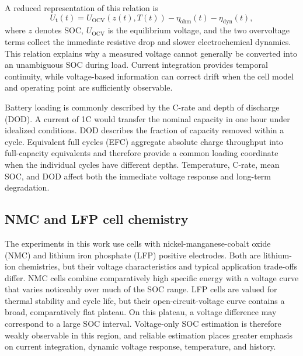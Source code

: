 \documentclass[
    a4paper,
    12pt,
    titlepage,
    bibliography=totoc,
    twoside=on,
    parskip=false,
    numbers=noenddot,
    cleardoublepage=empty,
    DIV=12,
    BCOR=12.0mm,
    headheight=36pt,
    headings=openright
]{scrreprt}
\begin{document}
A reduced representation of this relation is
\begin{equation}
    U_{\mathrm{t}}(t)
    =
    U_{\mathrm{OCV}}\!\left(z(t),T(t)\right)
    -
    \eta_{\mathrm{ohm}}(t)
    -
    \eta_{\mathrm{dyn}}(t),
    \label{eq:fundamental_terminal_voltage}
\end{equation}
where $z$ denotes SOC, $U_{\mathrm{OCV}}$ is the equilibrium voltage, and the two overvoltage terms collect the immediate resistive drop and slower electrochemical dynamics. This relation explains why a measured voltage cannot generally be converted into an unambiguous SOC during load. Current integration provides temporal continuity, while voltage-based information can correct drift when the cell model and operating point are sufficiently observable.

Battery loading is commonly described by the C-rate and depth of discharge (DOD). A current of 1C would transfer the nominal capacity in one hour under idealized conditions. DOD describes the fraction of capacity removed within a cycle. Equivalent full cycles (EFC) aggregate absolute charge throughput into full-capacity equivalents and therefore provide a common loading coordinate when the individual cycles have different depths. Temperature, C-rate, mean SOC, and DOD affect both the immediate voltage response and long-term degradation.

\subsection{NMC and LFP cell chemistry}
The experiments in this work use cells with nickel-manganese-cobalt oxide (NMC) and lithium iron phosphate (LFP) positive electrodes. Both are lithium-ion chemistries, but their voltage characteristics and typical application trade-offs differ. NMC cells combine comparatively high specific energy with a voltage curve that varies noticeably over much of the SOC range. LFP cells are valued for thermal stability and cycle life, but their open-circuit-voltage curve contains a broad, comparatively flat plateau. On this plateau, a voltage difference may correspond to a large SOC interval. Voltage-only SOC estimation is therefore weakly observable in this region, and reliable estimation places greater emphasis on current integration, dynamic voltage response, temperature, and history.\autocite{kurzweilElektrochemischeSpeicherSuperkondensatoren2018,plettBatteryManagementSystems2015,shrivastavaReviewTechnologicalAdvancement2023}
\end{document}
